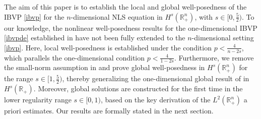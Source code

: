 \documentclass[preprint,compress,12pt]{elsarticle}
\numberwithin{equation}{section}
\begin{document}
The aim of this paper is to establish the local and global well-posedness of the IBVP \eqref{ibvp} for the $n$-dimensional NLS equation in $H^{s}(\mathbb{R}^{n}_{+})$, with $s\in[0,\frac{5}{2})$. To our knowledge, the nonlinear well-posedness results for the one-dimensional IBVP \eqref{ibvpde} established in \cite{chatter,figment} have not been fully extended to the $n$-dimensional setting \eqref{ibvp}. Here, local well-posedness is established under the condition $p<\frac{4}{n-2s}$, which parallels the one-dimensional condition $p<\frac{4}{1-2s}$. Furthermore, we remove the small-norm assumption in \cite{facilitate} and prove global well-posedness in $H^{s}(\mathbb{R}^{n}_{+})$ for the range $s\in[1,\frac{5}{2})$, thereby generalizing the one-dimensional global  result of \cite{figment} in $H^{s}(\mathbb{R}_{+})$. Moreover, global solutions are constructed for the first time in the lower regularity range $s\in[0,1)$, based on the key derivation of the $L^2(\mathbb{R}^{n}_{+})$ a priori estimates. Our results are formally stated in the next section.
\end{document}
